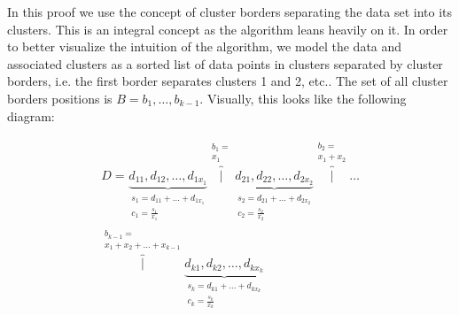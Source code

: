 \documentclass[conference]{IEEEtran}
\begin{document}
In this proof we use the concept of cluster borders separating the data set into its clusters.
This is an integral concept as the algorithm leans heavily on it.
In order to better visualize the intuition of the algorithm, we model the data and associated clusters as a sorted list of data points in clusters separated by cluster borders, i.e. the first border separates clusters 1 and 2, etc.. The set of all cluster borders positions is $B = b_1, \dots, b_{k-1}$. Visually, this looks like the following diagram:

\begin{equation}\begin{aligned}
D=
\underbrace{d_{11}, d_{12}, \dots, d_{1x_1}}_{\substack{s_1 = d_{11} + \dots + d_{1x_1} \\  c_1 = \frac{s_1}{x_1}}}
\overbrace{|}^{\substack{b_1 = \\ x_1}}
\underbrace{d_{21}, d_{22}, \dots, d_{2x_2}}_{\substack{s_2 = d_{21} + \dots + d_{2x_2} \\  c_2 = \frac{s_2}{x_2}}}
\overbrace{|}^{\substack{b_2 = \\ x_1 + x_2}}
\dots \\
\overbrace{|}^{\substack{b_{k-1} = \\ x_1 + x_2 + \dots + x_{k-1}}}
\underbrace{d_{k1}, d_{k2}, \dots, d_{kx_k}}_{\substack{s_k = d_{k1} + \dots + d_{kx_k} \\  c_k = \frac{s_k}{x_k}}}
\end{aligned}
\end{equation}
\end{document}
